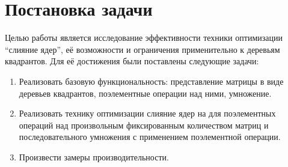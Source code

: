 
\section{Постановка задачи}
Целью работы является исследование эффективности техники оптимизации \enquote{слияние ядер}, её возможности и ограничения применительно к деревьям квадрантов.
Для её достижения были поставлены следующие задачи:
\begin{enumerate}
    \item Реализовать базовую функциональность: представление матрицы в виде деревьев квадрантов, поэлементные операции над ними, умножение.
    \item Реализовать технику оптимизации слияние ядер на \Th{} для поэлементных операций над произвольным фиксированным количеством матриц и последовательного умножения с применением поэлементной операции.
    \item Произвести замеры производительности.
\end{enumerate}
